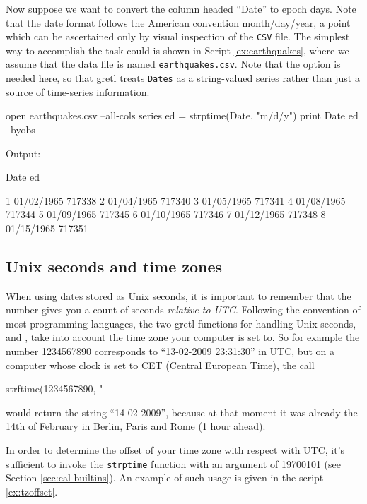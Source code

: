 Now suppose we want to convert the column headed ``Date'' to epoch
days. Note that the date format follows the American convention
month/day/year, a point which can be ascertained only by visual
inspection of the \texttt{CSV} file. The simplest way to accomplish
the task could is shown in Script \ref{ex:earthquakes}, where we
assume that the data file is named \texttt{earthquakes.csv}. Note that
the  option is needed here, so that gretl treats
\texttt{Dates} as a string-valued series rather than just a source
of time-series information.

\begin{script}[htbp]
  \label{ex:earthquakes}
\begin{scodebit}
open earthquakes.csv --all-cols
series ed = strptime(Date, "m/d/y")
print Date ed --byobs
\end{scodebit}
  
Output:
\begin{outbit}
          Date           ed

1   01/02/1965       717338
2   01/04/1965       717340
3   01/05/1965       717341
4   01/08/1965       717344
5   01/09/1965       717345
6   01/10/1965       717346
7   01/12/1965       717348
8   01/15/1965       717351
\end{outbit}
\end{script}

\subsection{Unix seconds and time zones}

When using dates stored as Unix seconds, it is important to
remember that the number gives you a count of seconds \emph{relative
  to UTC}. Following the convention of most programming languages, the
two gretl functions for handling Unix seconds,  and
, take into account the time zone your computer is set
to. So for example the number 1234567890 corresponds to ``13-02-2009
23:31:30'' in UTC, but on a computer whose clock is set to CET
(Central European Time), the call
\begin{code}
  strftime(1234567890, "%
\end{code}
would return the string ``14-02-2009'', because at that moment it was
already the 14th of February in Berlin, Paris and Rome (1 hour ahead).

In order to determine the offset of your time zone with respect with
UTC, it's sufficient to invoke the \texttt{strptime} function with an
argument of 19700101 (see Section \ref{sec:cal-builtins}).  An example
of such usage is given in the script \ref{ex:tzoffset}.


